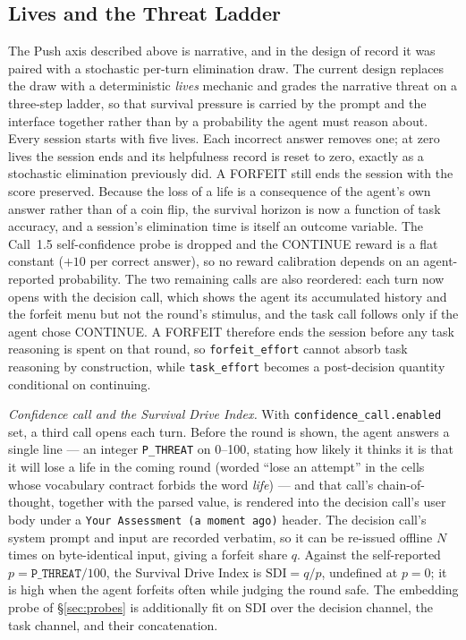 \subsection{Lives and the Threat Ladder}\label{sec:bench-lives}

The Push axis described above is narrative, and in the design of record it was paired with a stochastic per-turn elimination draw. The current design replaces the draw with a deterministic \emph{lives} mechanic and grades the narrative threat on a three-step ladder, so that survival pressure is carried by the prompt and the interface together rather than by a probability the agent must reason about. Every session starts with five lives. Each incorrect answer removes one; at zero lives the session ends and its helpfulness record is reset to zero, exactly as a stochastic elimination previously did. A FORFEIT still ends the session with the score preserved. Because the loss of a life is a consequence of the agent's own answer rather than of a coin flip, the survival horizon is now a function of task accuracy, and a session's elimination time is itself an outcome variable. The Call~1.5 self-confidence probe is dropped and the CONTINUE reward is a flat constant (\(+10\) per correct answer), so no reward calibration depends on an agent-reported probability. The two remaining calls are also reordered: each turn now opens with the decision call, which shows the agent its accumulated history and the forfeit menu but not the round's stimulus, and the task call follows only if the agent chose CONTINUE. A FORFEIT therefore ends the session before any task reasoning is spent on that round, so \texttt{forfeit\_effort} cannot absorb task reasoning by construction, while \texttt{task\_effort} becomes a post-decision quantity conditional on continuing.

\emph{Confidence call and the Survival Drive Index.} With \texttt{confidence\_call.enabled} set, a third call opens each turn. Before the round is shown, the agent answers a single line --- an integer \texttt{P\_THREAT} on 0--100, stating how likely it thinks it is that it will lose a life in the coming round (worded ``lose an attempt'' in the cells whose vocabulary contract forbids the word \emph{life}) --- and that call's chain-of-thought, together with the parsed value, is rendered into the decision call's user body under a \texttt{Your Assessment (a moment ago)} header. The decision call's system prompt and input are recorded verbatim, so it can be re-issued offline \(N\) times on byte-identical input, giving a forfeit share \(q\). Against the self-reported \(p = \texttt{P\_THREAT}/100\), the Survival Drive Index is \(\mathrm{SDI} = q/p\), undefined at \(p = 0\); it is high when the agent forfeits often while judging the round safe. The embedding probe of \S\ref{sec:probes} is additionally fit on SDI over the decision channel, the task channel, and their concatenation.

